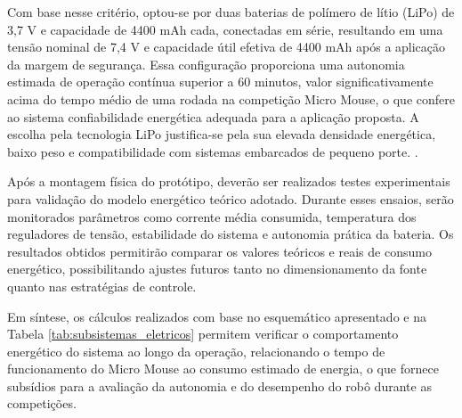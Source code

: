 Com base nesse critério, optou-se por duas baterias de polímero de lítio (LiPo) de
3,7 V e capacidade de 4400 mAh cada, conectadas em série, resultando em uma
tensão nominal de 7,4 V e capacidade útil efetiva de 4400 mAh após a aplicação
da margem de segurança. Essa configuração proporciona uma autonomia
estimada de operação contínua superior a 60 minutos, valor significativamente
acima do tempo médio de uma rodada na competição Micro Mouse, o que confere
ao sistema confiabilidade energética adequada para a aplicação proposta. A
escolha pela tecnologia LiPo justifica-se pela sua elevada densidade energética,
baixo peso e compatibilidade com sistemas embarcados de pequeno porte. \cite{feitosa2025}.

Após a montagem física do protótipo, deverão ser realizados testes experimentais 
para validação do modelo energético teórico adotado. Durante esses ensaios, 
serão monitorados parâmetros como corrente média consumida, temperatura dos 
reguladores de tensão, estabilidade do sistema e autonomia prática da bateria. Os 
resultados obtidos permitirão comparar os valores teóricos e reais de consumo 
energético, possibilitando ajustes futuros tanto no dimensionamento da fonte 
quanto nas estratégias de controle.

Em síntese, os cálculos realizados com base no esquemático apresentado e na 
Tabela \ref{tab:subsistemas_eletricos} permitem verificar o comportamento energético do sistema ao longo da 
operação, relacionando o tempo de funcionamento do Micro Mouse ao consumo 
estimado de energia, o que fornece subsídios para a avaliação da autonomia e do 
desempenho do robô durante as competições.

